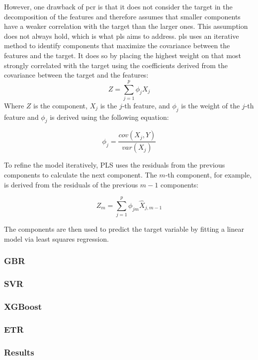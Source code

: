 However, one drawback of \gls{pcr} is that it does not consider the target in the decomposition of the features and therefore assumes that smaller components have a weaker correlation with the target than the larger ones. 
This assumption does not always hold, which is what \gls{pls} aims to address.
\gls{pls} uses an iterative method to identify components that maximize the covariance between the features and the target. 
It does so by placing the highest weight on that most strongly correlated with the target using the coefficients derived from the covariance between the target and the features:
$$
    Z = \sum_{j=1}^{p} \phi_j X_j 
$$
Where $Z$ is the component, $X_j$ is the $j$-th feature, and $\phi_j$ is the weight of the $j$-th feature and $\phi_j$ is derived using the following equation:

$$
    \phi_j = \frac{cov(X_j, Y)}{var(X_j)}
$$

To refine the model iteratively, PLS uses the residuals from the previous components to calculate the next component. The $m$-th component, for example, is derived from the residuals of the previous $m-1$ components:

$$
    Z_m = \sum_{j=1}^{p} \phi_{jm} \hat{X}_{j, m-1}
$$

The components are then used to predict the target variable by fitting a linear model via least squares regression.


\subsubsection{GBR} %

\subsubsection{SVR}

\subsubsection{XGBoost}

\subsubsection{ETR}

\subsubsection{Results}
